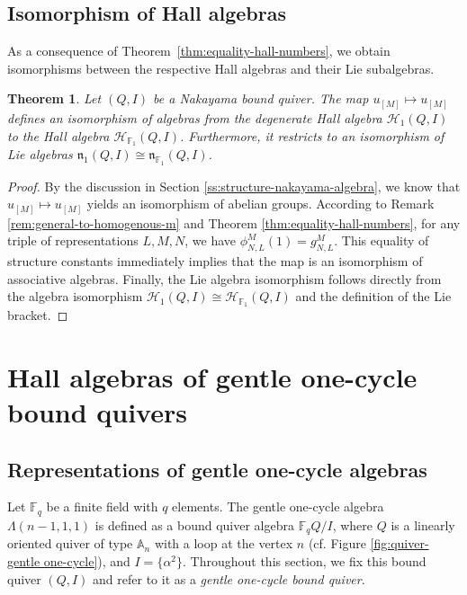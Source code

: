 \documentclass[12pt]{amsart}
\newtheorem{theorem}{Theorem}[section]
\theoremstyle{remark}
\theoremstyle{definition}
\numberwithin{equation}{section}
\begin{document}
\subsection{Isomorphism of Hall algebras}
As a consequence of Theorem~\ref{thm:equality-hall-numbers}, we obtain isomorphisms between the respective Hall algebras and their Lie subalgebras.
\begin{theorem}\label{thm:isom-hall-nakayma}
    Let $(Q,I)$ be a Nakayama bound quiver. The map $u_{[M]}\mapsto u_{[M]}$ defines an isomorphism of algebras from the degenerate Hall algebra $\mathcal{H}_1(Q,I)$ to the Hall algebra $\mathcal{H}_{\mathbb{F}_1}(Q,I)$. Furthermore, it restricts to an isomorphism of Lie algebras $\mathfrak{n}_{1}(Q,I)\cong \mathfrak{n}_{\mathbb{F}_1}(Q,I)$.
\end{theorem}
\begin{proof}
By the discussion in Section \ref{ss:structure-nakayama-algebra}, we know that $u_{[M]}\mapsto u_{[M]}$ yields an isomorphism of abelian groups. According to Remark \ref{rem:general-to-homogenous-m} and Theorem \ref{thm:equality-hall-numbers}, for any triple of representations $L,M,N$, we have $\phi_{N,L}^M(1)=g_{N,L}^M$. This equality of structure constants immediately implies that the map is an isomorphism of associative algebras. Finally, the Lie algebra isomorphism follows directly from the algebra isomorphism $\mathcal{H}_1(Q,I) \cong \mathcal{H}_{\mathbb{F}_1}(Q,I)$ and the definition of the Lie bracket.
    
\end{proof}



\section{Hall algebras of gentle one-cycle bound quivers}\label{s:hall-alg-gentle-one-cylce}
\subsection{Representations of gentle one-cycle algebras}
Let $\mathbb{F}_q$ be a finite field with $q$ elements. The gentle one-cycle algebra $\Lambda(n-1,1,1)$ is defined as a bound quiver algebra $\mathbb{F}_qQ/I$, where  $Q$ is a linearly oriented quiver of type $\mathbb{A}_n$ with  a loop at the vertex $n$ (cf. Figure \ref{fig:quiver-gentle one-cycle}), and $I=\{\alpha^2\}$. Throughout this section, we fix this bound quiver $(Q,I)$ and refer to it as a {\em gentle one-cycle bound quiver}. 
\end{document}
